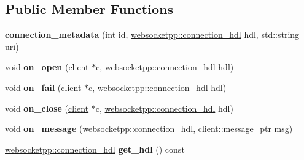 \subsection*{Public Member Functions}
\begin{DoxyCompactItemize}
\item 
{\bfseries connection\+\_\+metadata} (int id, \hyperlink{namespacewebsocketpp_a6b3d26a10ee7229b84b776786332631d}{websocketpp\+::connection\+\_\+hdl} hdl, std\+::string uri)\hypertarget{classconnection__metadata_ab73db2e336676ec4efa4d4dc5051958f}{}\label{classconnection__metadata_ab73db2e336676ec4efa4d4dc5051958f}

\item 
void {\bfseries on\+\_\+open} (\hyperlink{classwebsocketpp_1_1client}{client} $\ast$c, \hyperlink{namespacewebsocketpp_a6b3d26a10ee7229b84b776786332631d}{websocketpp\+::connection\+\_\+hdl} hdl)\hypertarget{classconnection__metadata_ab10d997bd75d9e98b235b7e97b84b85a}{}\label{classconnection__metadata_ab10d997bd75d9e98b235b7e97b84b85a}

\item 
void {\bfseries on\+\_\+fail} (\hyperlink{classwebsocketpp_1_1client}{client} $\ast$c, \hyperlink{namespacewebsocketpp_a6b3d26a10ee7229b84b776786332631d}{websocketpp\+::connection\+\_\+hdl} hdl)\hypertarget{classconnection__metadata_a1c2e652001b8306207beafe17b1a52ed}{}\label{classconnection__metadata_a1c2e652001b8306207beafe17b1a52ed}

\item 
void {\bfseries on\+\_\+close} (\hyperlink{classwebsocketpp_1_1client}{client} $\ast$c, \hyperlink{namespacewebsocketpp_a6b3d26a10ee7229b84b776786332631d}{websocketpp\+::connection\+\_\+hdl} hdl)\hypertarget{classconnection__metadata_ac297cf7710d8d510ef383b7395222ce5}{}\label{classconnection__metadata_ac297cf7710d8d510ef383b7395222ce5}

\item 
void {\bfseries on\+\_\+message} (\hyperlink{namespacewebsocketpp_a6b3d26a10ee7229b84b776786332631d}{websocketpp\+::connection\+\_\+hdl}, \hyperlink{classwebsocketpp_1_1endpoint_a585ecbbfd9689d4e4229e4c8378bd672}{client\+::message\+\_\+ptr} msg)\hypertarget{classconnection__metadata_a78708ddd026fc4fbff883477c0ed01bf}{}\label{classconnection__metadata_a78708ddd026fc4fbff883477c0ed01bf}

\item 
\hyperlink{namespacewebsocketpp_a6b3d26a10ee7229b84b776786332631d}{websocketpp\+::connection\+\_\+hdl} {\bfseries get\+\_\+hdl} () const\hypertarget{classconnection__metadata_a76a6a10e9192cd0ca03e2a2539cf4549}{}\label{classconnection__metadata_a76a6a10e9192cd0ca03e2a2539cf4549}


\end{DoxyCompactItemize}
